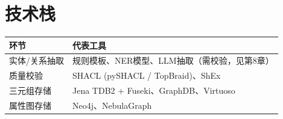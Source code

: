 \section{技术栈}

\begin{center}
\begin{tabular}{@{}ll@{}}
\toprule
\textbf{环节} & \textbf{代表工具} \\
\midrule
实体/关系抽取 & 规则模板、NER模型、LLM抽取（需校验，见第8章） \\
质量校验 & SHACL (pySHACL / TopBraid)、ShEx \\
三元组存储 & Jena TDB2 + Fuseki、GraphDB、Virtuoso \\
属性图存储 & Neo4j、NebulaGraph \\
\bottomrule
\end{tabular}
\end{center}
